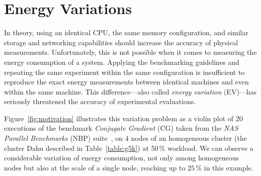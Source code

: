 








\section{Energy Variations}\label{sec:energy_variation}
In theory, using an identical CPU, the same memory configuration, and similar storage and networking capabilities should increase the accuracy of physical measurements.
Unfortunately, this is not possible when it comes to measuring the energy consumption of a system.
Applying the benchmarking guidelines and repeating the same experiment within the same configuration is insufficient to reproduce the exact energy measurements between identical machines and even within the same machine.
This difference---also called \emph{energy variation} (EV)---has seriously threatened the accuracy of experimental evaluations.

Figure~\ref{fig:motivation} illustrates this variation problem as a violin plot of $20$ executions of the benchmark \emph{Conjugate Gradient} (\textsf{CG}) taken from the \emph{NAS Parallel Benchmarks} (NBP) suite~\cite{Bailey:1991:NPB:125826.125925}, on $4$ nodes of an homogeneous cluster (the cluster \textsf{Dahu} described in Table~\ref{table:g5k}) at 50\,\% workload.
We can observe a considerable variation of energy consumption, not only among homogeneous nodes but also at the scale of a single node, reaching up to $25\,\%$ in this example.


